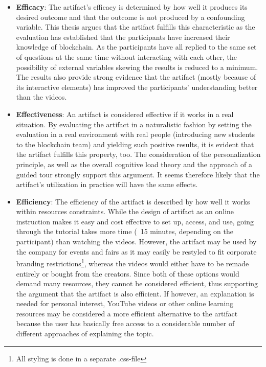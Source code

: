 \begin{itemize}
    \item \textbf{Efficacy}: The artifact's efficacy is determined by how well it produces its desired outcome and that the outcome is not produced by a confounding variable. This thesis argues that the artifact fulfills this characteristic as the evaluation has established that the participants have increased their knowledge of blockchain. As the participants have all replied to the same set of questions at the same time without interacting with each other, the possibility of external variables skewing the results is reduced to a minimum. The results also provide strong evidence that the artifact (mostly because of its interactive elements) has improved the participants' understanding better than the videos.
    \item \textbf{Effectiveness}: An artifact is considered effective if it works in a real situation. By evaluating the artifact in a naturalistic fashion by setting the evaluation in a real environment with real people (introducing new students to the blockchain team) and yielding such positive results, it is evident that the artifact fulfills this property, too. The consideration of the personalization principle, as well as the overall cognitive load theory and the approach of a guided tour strongly support this argument. It seems therefore likely that the artifact's utilization in practice will have the same effects.
    \item \textbf{Efficiency}: The efficiency of the artifact is described by how well it works within resources constraints. While the design of artifact as an online instruction makes it easy and cost effective to set up, access, and use, going through the tutorial takes more time (~15 minutes, depending on the participant) than watching the videos. However, the artifact may be used by the company for events and fairs as it may easily be restyled to fit corporate branding restrictions\footnote{All styling is done in a separate .css-file}, whereas the videos would either have to be remade entirely or bought from the creators. Since both of these options would demand many resources, they cannot be considered efficient, thus supporting the argument that the artifact is also efficient. If however, an explanation is needed for personal interest, YouTube videos or other online learning resources may be considered a more efficient alternative to the artifact because the user has basically free access to a considerable number of different approaches of explaining the topic.

\end{itemize}
